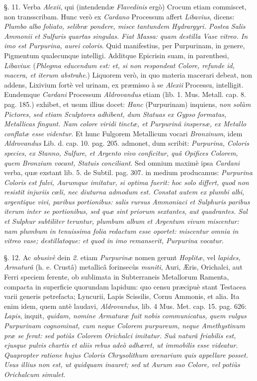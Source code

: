 \documentclass[a4paper, 11pt, oneside, polutonikogreek, german]{article}
\begin{document}
§. 11. Verba \emph{Alexii}, qui (intendendæ \emph{Flavedinis} ergò) Crocum etiam commiscet, non transscribam. Hunc verò ex \emph{Cardano} Processum affert \emph{Libavius}, dicens: \emph{Plumbo albo foliato, selibræ pondere, misce tantundem Hydrargyri. Postea Salis Ammonii et Sulfuris quartas singulas. Fiat Massa: quam destilla Vase vitreo. In imo est Purpurina, aurei coloris}. Quid manifestius, per Purpurinam, in genere, Pigmentum qualecunque intelligi. Additque Epicrisin suam, in parenthesi, \emph{Libavius}: (\emph{Phlegma educendum est: et, si non respondeat Colore, refunde id, macera, et iterum abstrahe}.) Liquorem verò, in quo materia macerari debeat, non addens, Lixivium fortè vel urinam, ex præmisso à se \emph{Alexii} Processu, intelligit. Eundemque \emph{Cardani} Processum \emph{Aldrovandus} etiam (lib. 1. Mus. Metall. cap. 8. pag. 185.) exhibet, et usum illius docet: \emph{Hanc} (Purpurinam) inquiens, \emph{non solùm Pictores, sed etiam Sculptores adhibent, dum Statuas ex Gypso formatas, Metallicas fingunt. Nam colore viridi tinctæ, et Purpurinâ inspersæ, ex Metallo conflatæ esse videntur}. Et hunc Fulgorem Metallicum vocari \emph{Bronzinum}, idem \emph{Aldrovandus} Lib. d. cap. 10. pag. 205. admonet, dum scribit: \emph{Purpurina, Coloris species, ex Stanno, Sulfure, et Argento vivo conficitur, quâ Opifices Colorem, quem Bronzium vocant, Statuis conciliant}. Sed omnium maximè ipsa \emph{Cardani} verba, quæ exstant lib. 5. de Subtil. pag. 307. in medium producamus: \emph{Purpurina Coloris est fulvi, Aurumque imitatur, si optima fuerit: hoc solo differt, quod non resistit injuriis cœli, nec diuturna admodum est. Constat autem ex plumbi albi, argentique vivi, paribus portionibus: salis rursus Ammoniaci et Sulphuris paribus iterum inter se portionibus, sed quæ sint priorum sextantes, aut quadrantes. Sal et Sulphur subtiliter teruntur, plumbum album et Argentum vivum miscentur: nam plumbum in tenuissima folia redactum esse oportet: miscentur omnia in vitreo vase; destillatoque: et quod in imo remanserit, Purpurina vocatur}.

§. 12. Ac \emph{abusivè} dein \emph{2.} etiam \emph{Purpurinæ} nomen gerunt \emph{Hoplitæ}, vel \emph{lapides, Armaturâ} (h. e. Crustâ) metallicâ forinsecùs \emph{muniti}, Auri, Æris, Orichalci, aut Ferri speciem ferente, ob sublimata in Subterraneis Metallorum Ramenta, compacta in superficie quorundam lapidum: quo censu præcipuè stant Testacea varii generis petrefacta; Lyncurii, Lapis Scissilis, Cornu Ammonis, et alia. Ita enim idem, quem antè laudavi, \emph{Aldrovandus}, lib. 4 Mus. Met. cap. 15. pag. 626: \emph{Lapis}, inquit, \emph{quidam, nomine Armaturæ fuit nobis communicatus, quem vulgus Purpurinam cognominat, cum neque Colorem purpureum, neque Amethystinum præ se ferat: sed potiùs Colorem Orichalci imitatur. Suâ naturâ friabilis est, ejusque pulvis chartis et aliis rebus adeò adhæret, ut immobilis esse videatur. Quapropter ratione hujus Coloris Chrysolithum arenarium quis appellare posset. Usus illius non est, ut quidquam inauret; sed ut Aurum suo Colore, vel potiùs Orichalcum simulet}.
\end{document}
